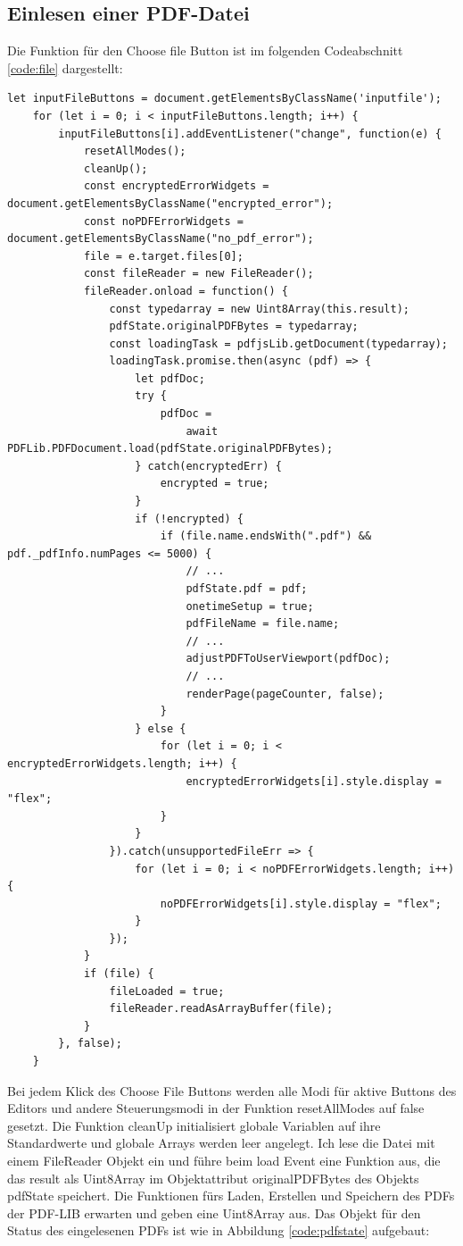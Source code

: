 \subsection{Einlesen einer PDF-Datei}
Die Funktion für den Choose file Button ist im folgenden Codeabschnitt \ref{code:file} dargestellt:

\begin{lstlisting}[style=ES6, caption={Einlesen einer PDF-Datei}, label=code:file, breaklines=true]
	let inputFileButtons = document.getElementsByClassName('inputfile');
	for (let i = 0; i < inputFileButtons.length; i++) {
		inputFileButtons[i].addEventListener("change", function(e) {
			resetAllModes();
			cleanUp();
			const encryptedErrorWidgets = document.getElementsByClassName("encrypted_error");
			const noPDFErrorWidgets = document.getElementsByClassName("no_pdf_error");
			file = e.target.files[0];
			const fileReader = new FileReader(); 
			fileReader.onload = function() {
				const typedarray = new Uint8Array(this.result);
				pdfState.originalPDFBytes = typedarray;
				const loadingTask = pdfjsLib.getDocument(typedarray);
				loadingTask.promise.then(async (pdf) => {
					let pdfDoc;
					try {
						pdfDoc = 
							await PDFLib.PDFDocument.load(pdfState.originalPDFBytes);
					} catch(encryptedErr) {
						encrypted = true;
					}
					if (!encrypted) {
						if (file.name.endsWith(".pdf") && pdf._pdfInfo.numPages <= 5000) {
							// ...
							pdfState.pdf = pdf;
							onetimeSetup = true;
							pdfFileName = file.name;
							// ...
							adjustPDFToUserViewport(pdfDoc);
							// ...
							renderPage(pageCounter, false);
						}
					} else {
						for (let i = 0; i < encryptedErrorWidgets.length; i++) {
							encryptedErrorWidgets[i].style.display = "flex";
						}
					}
				}).catch(unsupportedFileErr => {
					for (let i = 0; i < noPDFErrorWidgets.length; i++) {
						noPDFErrorWidgets[i].style.display = "flex";
					}
				});
			}
			if (file) {
				fileLoaded = true;
				fileReader.readAsArrayBuffer(file);
			}
		}, false);
	}
\end{lstlisting} 

Bei jedem Klick des Choose File Buttons werden alle Modi für aktive Buttons des Editors und andere Steuerungsmodi in der Funktion resetAllModes auf false gesetzt. Die Funktion cleanUp initialisiert globale Variablen auf ihre Standardwerte und globale Arrays werden leer angelegt. Ich lese die Datei mit einem FileReader Objekt ein und führe beim load Event eine Funktion aus, die das result als Uint8Array im Objektattribut originalPDFBytes des Objekts pdfState speichert. Die Funktionen fürs Laden, Erstellen und Speichern des PDFs der PDF-LIB erwarten und geben eine Uint8Array aus. Das Objekt für den Status des eingelesenen PDFs ist wie in Abbildung \ref{code:pdfstate} aufgebaut:

